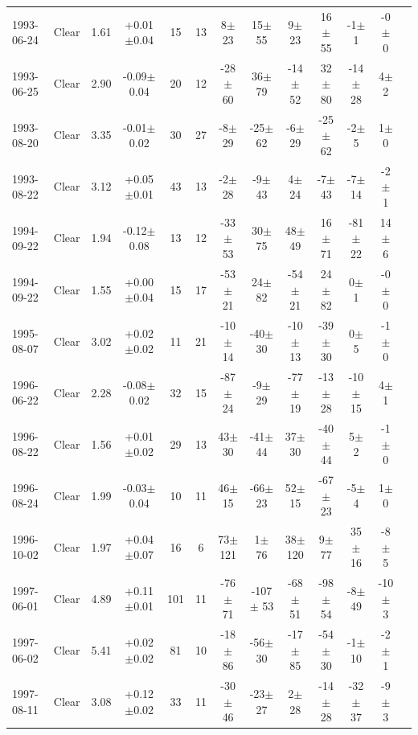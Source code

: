 \documentclass[12pt,a4paper]{report}
\begin{document}
\begin{landscape}
\begin{longtable}{|l|c|c|c|c|c|c|c|c|c|c|c|c|}
1993-06-24 & Clear & 1.61 & +0.01$\pm$0.04 &  15 &  13 &    8$\pm$ 23 &   15$\pm$ 55 &    9$\pm$ 23 &   16$\pm$ 55 &   -1$\pm$  1 &   -0$\pm$  0 \\ 
1993-06-25 & Clear & 2.90 & -0.09$\pm$0.04 &  20 &  12 &  -28$\pm$ 60 &   36$\pm$ 79 &  -14$\pm$ 52 &   32$\pm$ 80 &  -14$\pm$ 28 &    4$\pm$  2 \\ 
1993-08-20 & Clear & 3.35 & -0.01$\pm$0.02 &  30 &  27 &   -8$\pm$ 29 &  -25$\pm$ 62 &   -6$\pm$ 29 &  -25$\pm$ 62 &   -2$\pm$  5 &    1$\pm$  0 \\ 
1993-08-22 & Clear & 3.12 & +0.05$\pm$0.01 &  43 &  13 &   -2$\pm$ 28 &   -9$\pm$ 43 &    4$\pm$ 24 &   -7$\pm$ 43 &   -7$\pm$ 14 &   -2$\pm$  1 \\ 
1994-09-22 & Clear & 1.94 & -0.12$\pm$0.08 &  13 &  12 &  -33$\pm$ 53 &   30$\pm$ 75 &   48$\pm$ 49 &   16$\pm$ 71 &  -81$\pm$ 22 &   14$\pm$  6 \\ 
1994-09-22 & Clear & 1.55 & +0.00$\pm$0.04 &  15 &  17 &  -53$\pm$ 21 &   24$\pm$ 82 &  -54$\pm$ 21 &   24$\pm$ 82 &    0$\pm$  1 &   -0$\pm$  0 \\ 
1995-08-07 & Clear & 3.02 & +0.02$\pm$0.02 &  11 &  21 &  -10$\pm$ 14 &  -40$\pm$ 30 &  -10$\pm$ 13 &  -39$\pm$ 30 &    0$\pm$  5 &   -1$\pm$  0 \\ 
1996-06-22 & Clear & 2.28 & -0.08$\pm$0.02 &  32 &  15 &  -87$\pm$ 24 &   -9$\pm$ 29 &  -77$\pm$ 19 &  -13$\pm$ 28 &  -10$\pm$ 15 &    4$\pm$  1 \\ 
1996-08-22 & Clear & 1.56 & +0.01$\pm$0.02 &  29 &  13 &   43$\pm$ 30 &  -41$\pm$ 44 &   37$\pm$ 30 &  -40$\pm$ 44 &    5$\pm$  2 &   -1$\pm$  0 \\ 
1996-08-24 & Clear & 1.99 & -0.03$\pm$0.04 &  10 &  11 &   46$\pm$ 15 &  -66$\pm$ 23 &   52$\pm$ 15 &  -67$\pm$ 23 &   -5$\pm$  4 &    1$\pm$  0 \\ 
1996-10-02 & Clear & 1.97 & +0.04$\pm$0.07 &  16 &   6 &   73$\pm$121 &    1$\pm$ 76 &   38$\pm$120 &    9$\pm$ 77 &   35$\pm$ 16 &   -8$\pm$  5 \\ 
1997-06-01 & Clear & 4.89 & +0.11$\pm$0.01 & 101 &  11 &  -76$\pm$ 71 & -107$\pm$ 53 &  -68$\pm$ 51 &  -98$\pm$ 54 &   -8$\pm$ 49 &  -10$\pm$  3 \\ 
1997-06-02 & Clear & 5.41 & +0.02$\pm$0.02 &  81 &  10 &  -18$\pm$ 86 &  -56$\pm$ 30 &  -17$\pm$ 85 &  -54$\pm$ 30 &   -1$\pm$ 10 &   -2$\pm$  1 \\ 
1997-08-11 & Clear & 3.08 & +0.12$\pm$0.02 &  33 &  11 &  -30$\pm$ 46 &  -23$\pm$ 27 &    2$\pm$ 28 &  -14$\pm$ 28 &  -32$\pm$ 37 &   -9$\pm$  3 \\ 

\end{longtable}
\end{landscape}
\end{document}
